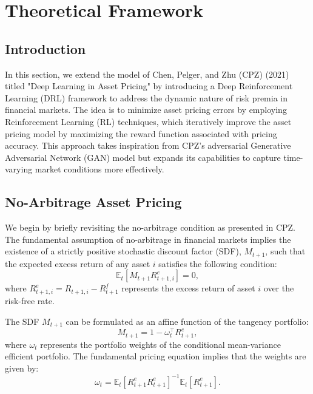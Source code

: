 \section{Theoretical Framework}

\subsection{Introduction}
In this section, we extend the model of Chen, Pelger, and Zhu (CPZ) (2021) titled "Deep Learning in Asset Pricing" by introducing a Deep Reinforcement Learning (DRL) framework to address the dynamic nature of risk premia in financial markets. The idea is to minimize asset pricing errors by employing Reinforcement Learning (RL) techniques, which iteratively improve the asset pricing model by maximizing the reward function associated with pricing accuracy. This approach takes inspiration from CPZ's adversarial Generative Adversarial Network (GAN) model but expands its capabilities to capture time-varying market conditions more effectively.

\subsection{No-Arbitrage Asset Pricing}

We begin by briefly revisiting the no-arbitrage condition as presented in CPZ. The fundamental assumption of no-arbitrage in financial markets implies the existence of a strictly positive stochastic discount factor (SDF), $M_{t+1}$, such that the expected excess return of any asset $i$ satisfies the following condition:
\begin{equation}
    \mathbb{E}_t[M_{t+1} R_{t+1,i}^e] = 0, 
\end{equation}
where $R_{t+1,i}^e = R_{t+1,i} - R_{t+1}^f$ represents the excess return of asset $i$ over the risk-free rate.

The SDF $M_{t+1}$ can be formulated as an affine function of the tangency portfolio:
\begin{equation}
    M_{t+1} = 1 - \omega_t^\top R_{t+1}^e,
\end{equation}
where $\omega_t$ represents the portfolio weights of the conditional mean-variance efficient portfolio. The fundamental pricing equation implies that the weights are given by:
\begin{equation}
    \omega_t = \mathbb{E}_t[R_{t+1}^e R_{t+1}^e]^{-1} \mathbb{E}_t[R_{t+1}^e].
\end{equation}

